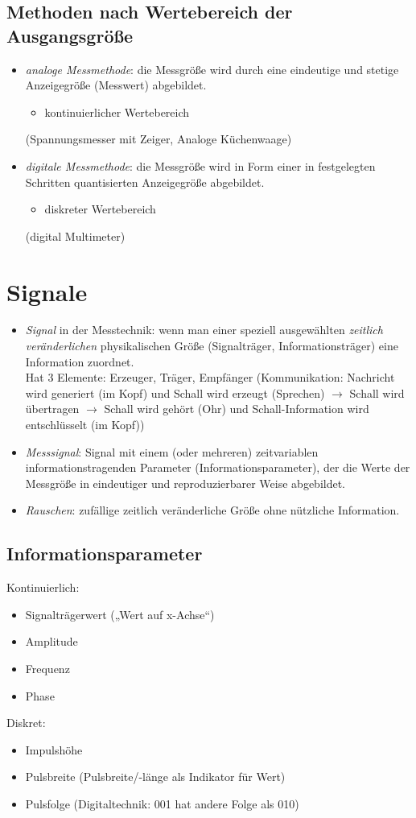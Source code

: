 \documentclass{scrreprt}
\begin{document}
\subsection{Methoden nach Wertebereich der Ausgangsgröße}
\begin{itemize}
\item \emph{analoge Messmethode}: die Messgröße wird durch eine eindeutige und stetige Anzeigegröße (Messwert) abgebildet.
\begin{itemize}[label=\textbullet]
\item kontinuierlicher Wertebereich
\end{itemize}
(Spannungsmesser mit Zeiger, Analoge Küchenwaage)
\item \emph{digitale Messmethode}: die Messgröße wird in Form einer in festgelegten Schritten quantisierten Anzeigegröße abgebildet.
\begin{itemize}[label=\textbullet]
\item diskreter Wertebereich
\end{itemize}
(digital Multimeter)
\end{itemize}

\section{Signale}
\begin{itemize}
\item \emph{Signal} in der Messtechnik: wenn man einer speziell ausgewählten \emph{zeitlich veränderlichen} physikalischen Größe (Signalträger, Informationsträger) eine Information zuordnet. \\
Hat 3 Elemente: Erzeuger, Träger, Empfänger (Kommunikation: Nachricht wird generiert (im Kopf) und Schall wird erzeugt (Sprechen) $\to$ Schall wird übertragen $\to$ Schall wird gehört (Ohr) und Schall-Information wird entschlüsselt (im Kopf))
\item \emph{Messsignal}: Signal mit einem (oder mehreren) zeitvariablen informationstragenden Parameter (Informationsparameter), der die Werte der Messgröße in eindeutiger und reproduzierbarer Weise abgebildet.
\item \emph{Rauschen}: zufällige zeitlich veränderliche Größe ohne nützliche Information.
\end{itemize}

\subsection{Informationsparameter}
Kontinuierlich:
\begin{itemize}
\item Signalträgerwert („Wert auf x-Achse“)
\item Amplitude
\item Frequenz
\item Phase
\end{itemize}
Diskret:
\begin{itemize}
\item Impulshöhe
\item Pulsbreite (Pulsbreite/-länge als Indikator für Wert)
\item Pulsfolge (Digitaltechnik: 001 hat andere Folge als 010)
\end{itemize}
\end{document}
